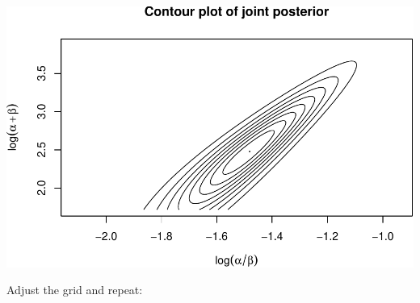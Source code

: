 \documentclass[]{article}
\begin{document}
\includegraphics{Untitled_files/figure-latex/unnamed-chunk-18-1.pdf}

Adjust the grid and repeat:
\end{document}
